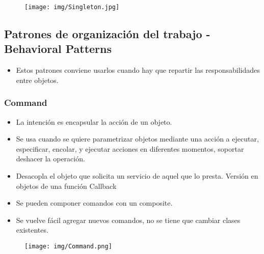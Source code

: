 \begin{figure}[!htb]
    \centering
    \texttt{[image: img/Singleton.jpg]}
\end{figure}


\subsection*{Patrones de organización del trabajo - Behavioral Patterns}
\begin{itemize}
\item Estos patrones conviene usarlos cuando hay que repartir las responsabilidades entre objetos.
\end{itemize}


\subsubsection*{Command}
\begin{itemize}
\item La intención es encapsular la acción de un objeto.
\item Se usa cuando se quiere parametrizar objetos mediante una acción a ejecutar, especificar, encolar, y ejecutar acciones en diferentes momentos, soportar deshacer la operación.
\item Desacopla el objeto que solicita un servicio de aquel que lo presta. Versión en objetos de una función Callback
\item Se pueden componer comandos con un composite.
\item Se vuelve fácil agregar nuevos comandos, no se tiene que cambiar clases existentes.
\end{itemize}


\begin{figure}[!htb]
    \centering
    \texttt{[image: img/Command.png]}
\end{figure}

